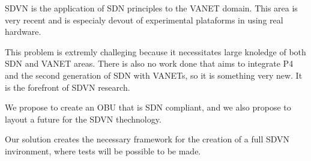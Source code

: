 




SDVN is the application of SDN principles to the VANET domain. This area is very recent and is especialy devout of experimental plataforms in using real hardware.

This problem is extremly challeging because it necessitates large knoledge of both SDN and VANET areas. There is also no work done that aims to integrate P4 and the second generation of SDN with VANETs, so it is something very new. It is the forefront of SDVN research. 


We propose to create an OBU that is SDN compliant, and we also propose to layout a future for the SDVN thechnology.

Our solution creates the necessary framework for the creation of a full SDVN invironment, where tests will be possible to be made.






